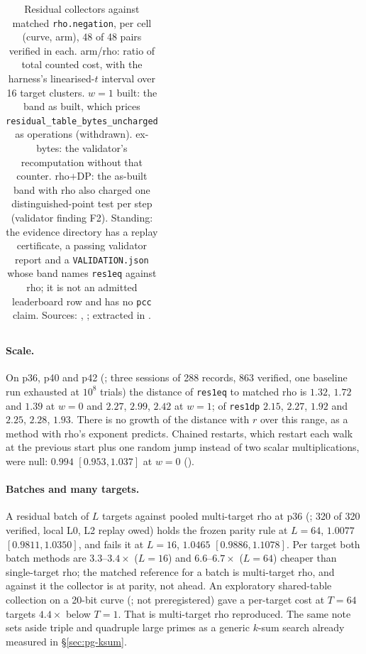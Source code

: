 \begin{table}[t]
\begin{tabular}{@{}llrrrrr@{}}
\bottomrule
\end{tabular}
\caption[]{Residual collectors against matched \texttt{rho.negation}, per
cell (curve, arm), 48 of 48 pairs verified in each. arm/rho: ratio of
total counted cost, with the harness's linearised-$t$ interval over 16
target clusters. $w=1$ built: the band as built, which prices
\texttt{residual\_table\_bytes\_uncharged} as operations (withdrawn).
ex-bytes: the validator's recomputation without that counter. rho$+$DP:
the as-built band with rho also charged one distinguished-point test per
step (validator finding F2). Standing: the evidence directory has a
replay certificate, a passing validator report and a
\texttt{VALIDATION.json} whose band names \texttt{res1eq} against rho; it
is not an admitted leaderboard row and has no \texttt{pcc} claim. Sources:
,
;
extracted in .}
\label{tab:pf-residual-cells}
\end{table}

\paragraph{Scale.} On p36, p40 and p42 (;
three sessions of 288 records, 863 verified, one baseline run exhausted at
$10^8$ trials) the distance of \texttt{res1eq} to matched rho is $1.32$,
$1.72$ and $1.39$ at $w=0$ and $2.27$, $2.99$, $2.42$ at $w=1$; of
\texttt{res1dp} $2.15$, $2.27$, $1.92$ and $2.25$, $2.28$, $1.93$. There is
no growth of the distance with $r$ over this range, as a method with rho's
exponent predicts. Chained restarts, which restart each walk at the
previous start plus one random jump instead of two scalar multiplications,
were null: $0.994$ $[0.953,1.037]$ at $w=0$
().

\paragraph{Batches and many targets.} A residual batch of $L$ targets
against pooled multi-target rho at p36
(; 320 of 320 verified,
local L0, L2 replay owed) holds the frozen parity rule at $L=64$, $1.0077$
$[0.9811,1.0350]$, and fails it at $L=16$, $1.0465$ $[0.9886,1.1078]$. Per
target both batch methods are $3.3$--$3.4\times$ ($L=16$) and
$6.6$--$6.7\times$ ($L=64$) cheaper than single-target rho; the matched
reference for a batch is multi-target rho, and against it the collector is
at parity, not ahead. An exploratory shared-table collection on a 20-bit
curve (; not
preregistered) gave a per-target cost at $T=64$ targets $4.4\times$ below
$T=1$. That is multi-target rho reproduced. The same note sets aside
triple and quadruple large primes as a generic $k$-sum search already
measured in \S\ref{sec:pg-ksum}.

